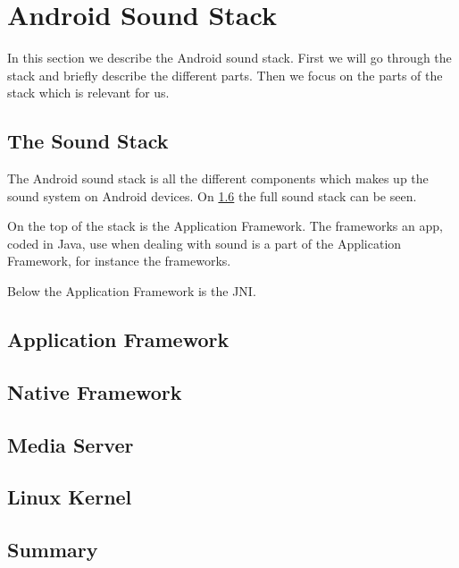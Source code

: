 \section{Android Sound Stack}
In this section we describe the Android sound stack.
First we will go through the stack and briefly describe the different parts. 
Then we focus on the parts of the stack which is relevant for us.

\subsection{The Sound Stack}
The Android sound stack is all the different components which makes up the sound system on Android devices.
On \cref{} the full sound stack can be seen.

On the top of the stack is the Application Framework.
The frameworks an app, coded in Java, use when dealing with sound is a part of the Application Framework,
for instance the  frameworks.

Below the Application Framework is the \ac{JNI}.





\subsection{Application Framework}
\subsection{Native Framework}
\subsection{Media Server}
\subsection{Linux Kernel}
\subsection{Summary}


